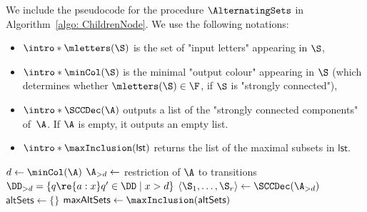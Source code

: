 \documentclass{theoretics}
\begin{document}
We include the pseudocode for the procedure $\AlternatingSets$ in Algorithm~\ref{algo: ChildrenNode}. We use the following notations:
\begin{itemize}
	\item \AP $\intro*\mletters(\S)$ is the set of "input letters" appearing in $\S$,
	\item \AP $\intro*\minCol(\S)$ is the minimal "output colour" appearing in  $\S$ (which determines whether $\mletters(\S)\in \F$, if $\S$ is "strongly connected"),
	\item \AP $\intro*\SCCDec(\A)$ outputs a list of the "strongly connected components" of~$\A$. If $\A$ is empty, it outputs an empty list.
	\item \AP $\intro*\maxInclusion(\mathsf{lst})$ returns the list of the maximal subsets in $\mathsf{lst}$.
\end{itemize}

\begin{algorithm}[ht]
	\caption{ $\intro*\AlternatingSets(\A)$: Computing the children of a node.}
	\label{algo: ChildrenNode}
		$d \leftarrow \minCol(\A)$\;
		 $\A_{>d} \leftarrow $ restriction of $\A$ to transitions $\DD_{>d}=\{ q\re{a:x}q'\in \DD \mid x>d\}$\;
		 $\langle \S_1, \dots, \S_r\rangle \leftarrow \SCCDec(\A_{>d})$ \;
		 $\mathsf{altSets}\leftarrow \{ \}$ \;
		 $\mathsf{maxAltSets} \leftarrow \maxInclusion(\mathsf{altSets})$ \label{line AS : MaxLetters}\;
		  \label{line AS : Return}\;
\end{algorithm}
\end{document}
